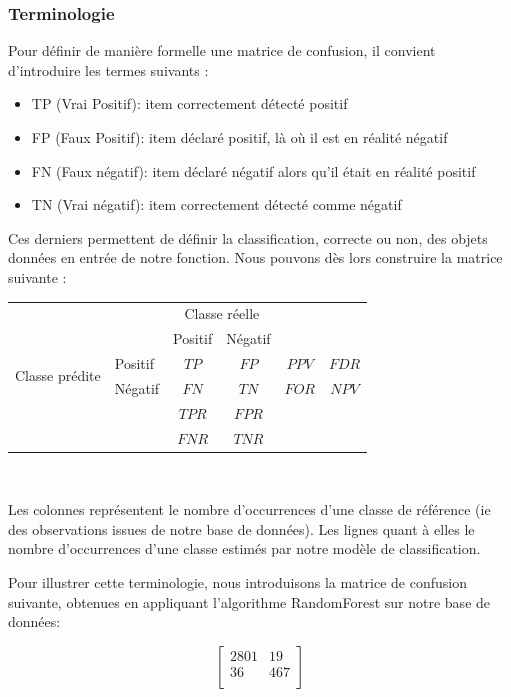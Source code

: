 \documentclass[a4paper]{report}
\begin{document}
\subsubsection{Terminologie}
Pour définir de manière formelle une matrice de confusion, il convient d'introduire les termes suivants : 
\begin{itemize}
\item TP (Vrai Positif): item correctement détecté positif 
\item FP (Faux Positif): item déclaré positif, là où il est en réalité négatif
\item FN (Faux négatif): item déclaré négatif alors qu'il était en réalité positif
\item TN (Vrai négatif): item correctement détecté comme négatif
\end{itemize}
\medskip
Ces derniers permettent de définir la classification, correcte ou non, des objets données en entrée de notre fonction. Nous pouvons dès lors construire la matrice suivante : 

\begin{tabular}{ l | l | c | c | c c}
\multicolumn{2}{c}{} & \multicolumn{2}{c}{Classe réelle} & \\
\cline{3-4}
\multicolumn{2}{c|}{} & Positif & Négatif \\
\cline{2-4}
\multirow{2}{*}{Classe prédite} & Positif & $TP$ & $FP$ & $PPV$ & $FDR$ \\
\cline{2-4}
& Négatif & $FN$ & $TN$ & $FOR$ & $NPV$ \\
\cline{2-4}
\multicolumn{1}{r}{} & \multicolumn{1}{l}{} & \multicolumn{1}{c}{$TPR$} & \multicolumn{1}{c}{$FPR$} \\
\multicolumn{1}{l}{} & \multicolumn{1}{l}{} & \multicolumn{1}{c}{$FNR$} & \multicolumn{1}{c}{$TNR$} \\
\end{tabular}

~\par
Les colonnes représentent le nombre d'occurrences d’une classe de référence (ie des observations issues de notre base de données). Les lignes quant à elles le nombre d'occurrences d’une classe estimés par notre modèle de classification. 
~\par
\medskip
Pour illustrer cette terminologie, nous introduisons la matrice de confusion suivante, obtenues en appliquant l’algorithme RandomForest sur notre base de données:

$$\begin{bmatrix}
2801 & 19 \\ 
36 & 467 \\
\end{bmatrix}$$
\end{document}
